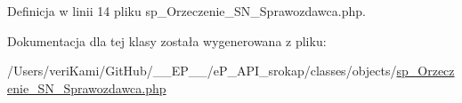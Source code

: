 Definicja w linii 14 pliku sp\-\_\-\-Orzeczenie\-\_\-\-S\-N\-\_\-\-Sprawozdawca.\-php.



Dokumentacja dla tej klasy została wygenerowana z pliku\-:\begin{DoxyCompactItemize}
\item 
/\-Users/veri\-Kami/\-Git\-Hub/\-\_\-\-\_\-\-E\-P\-\_\-\-\_\-/e\-P\-\_\-\-A\-P\-I\-\_\-srokap/classes/objects/\hyperlink{sp___orzeczenie___s_n___sprawozdawca_8php}{sp\-\_\-\-Orzeczenie\-\_\-\-S\-N\-\_\-\-Sprawozdawca.\-php}\end{DoxyCompactItemize}
